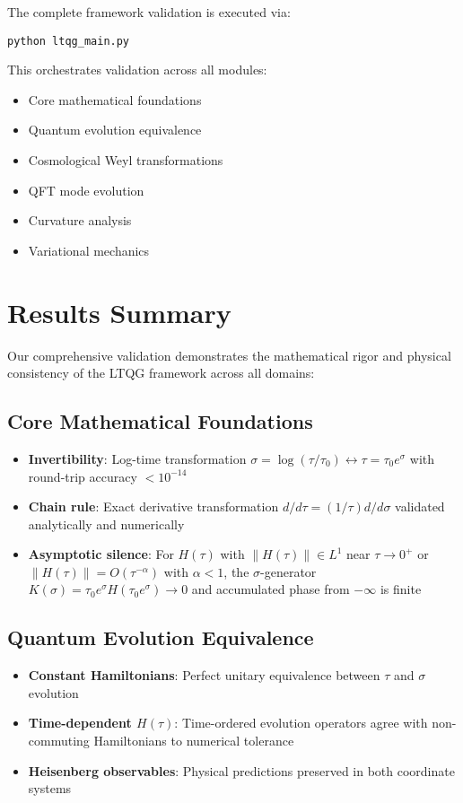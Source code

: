 \documentclass[11pt]{article}
\begin{document}
The complete framework validation is executed via:
\begin{verbatim}
python ltqg_main.py
\end{verbatim}

This orchestrates validation across all modules:
\begin{itemize}
\item Core mathematical foundations
\item Quantum evolution equivalence  
\item Cosmological Weyl transformations
\item QFT mode evolution
\item Curvature analysis
\item Variational mechanics
\end{itemize}

\section{Results Summary}

Our comprehensive validation demonstrates the mathematical rigor and physical consistency of the LTQG framework across all domains:

\subsection{Core Mathematical Foundations}
\begin{itemize}
\item \textbf{Invertibility}: Log-time transformation $\sigma = \log(\tau/\tau_0) \leftrightarrow \tau = \tau_0 e^\sigma$ with round-trip accuracy $< 10^{-14}$
\item \textbf{Chain rule}: Exact derivative transformation $d/d\tau = (1/\tau) d/d\sigma$ validated analytically and numerically
\item \textbf{Asymptotic silence}: For $H(\tau)$ with $\|H(\tau)\| \in L^1$ near $\tau \to 0^+$ or $\|H(\tau)\| = O(\tau^{-\alpha})$ with $\alpha < 1$, the $\sigma$-generator $K(\sigma) = \tau_0 e^\sigma H(\tau_0 e^\sigma) \to 0$ and accumulated phase from $-\infty$ is finite
\end{itemize}

\subsection{Quantum Evolution Equivalence}
\begin{itemize}
\item \textbf{Constant Hamiltonians}: Perfect unitary equivalence between $\tau$ and $\sigma$ evolution
\item \textbf{Time-dependent $H(\tau)$}: Time-ordered evolution operators agree with non-commuting Hamiltonians to numerical tolerance
\item \textbf{Heisenberg observables}: Physical predictions preserved in both coordinate systems
\end{itemize}
\end{document}

